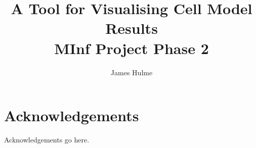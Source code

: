 \documentclass[bsc, frontabs, twoside, singlespacing, parskip]{infthesis}
\begin{document}
\title{A Tool for Visualising Cell Model Results \\
       MInf Project Phase 2}
\author{James Hulme}

\maketitle

\section*{Acknowledgements}
Acknowledgements go here.

\thispagestyle{empty}

\newpage


\thispagestyle{empty}

\newpage

\tableofcontents
\thispagestyle{empty}

\clearpage
\setcounter{page}{1}





%


\clearpage
%


{}


\end{document}
